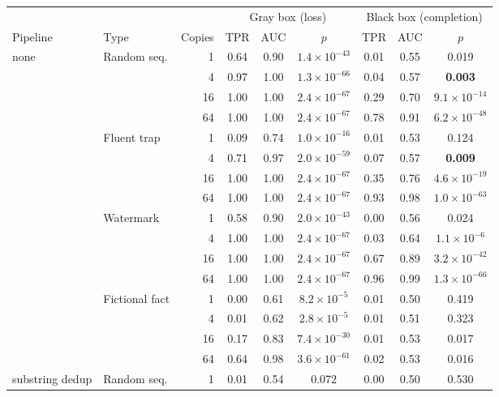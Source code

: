 \begin{tabular}{llrcccccc}
\toprule
 & & & \multicolumn{3}{c}{Gray box (loss)} & \multicolumn{3}{c}{Black box (completion)} \\
\cmidrule(lr){4-6}\cmidrule(lr){7-9}
Pipeline & Type & Copies & TPR & AUC & $p$ & TPR & AUC & $p$ \\
\midrule
none & Random seq. & 1 & 0.64 & 0.90 & \textbf{$1.4{\times}10^{-43}$} & 0.01 & 0.55 & 0.019 \\
 &  & 4 & 0.97 & 1.00 & \textbf{$1.3{\times}10^{-66}$} & 0.04 & 0.57 & \textbf{0.003} \\
 &  & 16 & 1.00 & 1.00 & \textbf{$2.4{\times}10^{-67}$} & 0.29 & 0.70 & \textbf{$9.1{\times}10^{-14}$} \\
 &  & 64 & 1.00 & 1.00 & \textbf{$2.4{\times}10^{-67}$} & 0.78 & 0.91 & \textbf{$6.2{\times}10^{-48}$} \\
 & Fluent trap & 1 & 0.09 & 0.74 & \textbf{$1.0{\times}10^{-16}$} & 0.01 & 0.53 & 0.124 \\
 &  & 4 & 0.71 & 0.97 & \textbf{$2.0{\times}10^{-59}$} & 0.07 & 0.57 & \textbf{0.009} \\
 &  & 16 & 1.00 & 1.00 & \textbf{$2.4{\times}10^{-67}$} & 0.35 & 0.76 & \textbf{$4.6{\times}10^{-19}$} \\
 &  & 64 & 1.00 & 1.00 & \textbf{$2.4{\times}10^{-67}$} & 0.93 & 0.98 & \textbf{$1.0{\times}10^{-63}$} \\
 & Watermark & 1 & 0.58 & 0.90 & \textbf{$2.0{\times}10^{-43}$} & 0.00 & 0.56 & 0.024 \\
 &  & 4 & 1.00 & 1.00 & \textbf{$2.4{\times}10^{-67}$} & 0.03 & 0.64 & \textbf{$1.1{\times}10^{-6}$} \\
 &  & 16 & 1.00 & 1.00 & \textbf{$2.4{\times}10^{-67}$} & 0.67 & 0.89 & \textbf{$3.2{\times}10^{-42}$} \\
 &  & 64 & 1.00 & 1.00 & \textbf{$2.4{\times}10^{-67}$} & 0.96 & 0.99 & \textbf{$1.3{\times}10^{-66}$} \\
 & Fictional fact & 1 & 0.00 & 0.61 & \textbf{$8.2{\times}10^{-5}$} & 0.01 & 0.50 & 0.419 \\
 &  & 4 & 0.01 & 0.62 & \textbf{$2.8{\times}10^{-5}$} & 0.01 & 0.51 & 0.323 \\
 &  & 16 & 0.17 & 0.83 & \textbf{$7.4{\times}10^{-30}$} & 0.01 & 0.53 & 0.017 \\
 &  & 64 & 0.64 & 0.98 & \textbf{$3.6{\times}10^{-61}$} & 0.02 & 0.53 & 0.016 \\
\midrule
substring dedup & Random seq. & 1 & 0.01 & 0.54 & 0.072 & 0.00 & 0.50 & 0.530 \\

\end{tabular}
